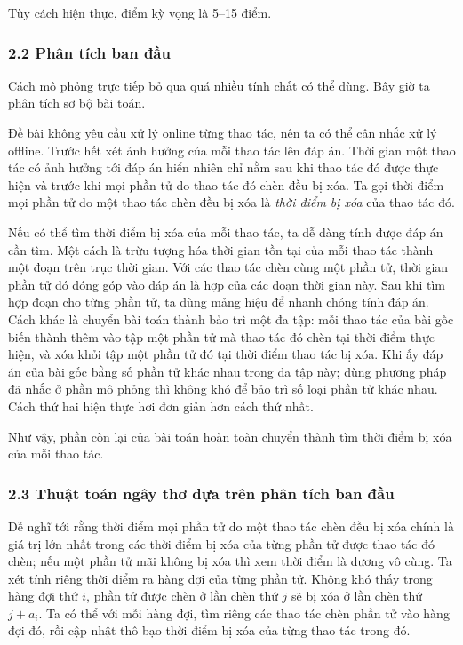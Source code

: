 \documentclass[11pt]{article}
\begin{document}
Tùy cách hiện thực, điểm kỳ vọng là 5--15 điểm.

\subsubsection*{2.2 Phân tích ban đầu}

Cách mô phỏng trực tiếp bỏ qua quá nhiều tính chất có thể dùng. Bây giờ ta phân
tích sơ bộ bài toán.

Đề bài không yêu cầu xử lý online từng thao tác, nên ta có thể cân nhắc xử lý
offline. Trước hết xét ảnh hưởng của mỗi thao tác lên đáp án. Thời gian một
thao tác có ảnh hưởng tới đáp án hiển nhiên chỉ nằm sau khi thao tác đó được
thực hiện và trước khi mọi phần tử do thao tác đó chèn đều bị xóa. Ta gọi thời
điểm mọi phần tử do một thao tác chèn đều bị xóa là \emph{thời điểm bị xóa} của
thao tác đó.

Nếu có thể tìm thời điểm bị xóa của mỗi thao tác, ta dễ dàng tính được đáp án
cần tìm. Một cách là trừu tượng hóa thời gian tồn tại của mỗi thao tác thành
một đoạn trên trục thời gian. Với các thao tác chèn cùng một phần tử, thời gian
phần tử đó đóng góp vào đáp án là hợp của các đoạn thời gian này. Sau khi tìm
hợp đoạn cho từng phần tử, ta dùng mảng hiệu để nhanh chóng tính đáp án. Cách
khác là chuyển bài toán thành bảo trì một đa tập: mỗi thao tác của bài gốc biến
thành thêm vào tập một phần tử mà thao tác đó chèn tại thời điểm thực hiện, và
xóa khỏi tập một phần tử đó tại thời điểm thao tác bị xóa. Khi ấy đáp án của bài
gốc bằng số phần tử khác nhau trong đa tập này; dùng phương pháp đã nhắc ở phần
mô phỏng thì không khó để bảo trì số loại phần tử khác nhau. Cách thứ hai hiện
thực hơi đơn giản hơn cách thứ nhất.

Như vậy, phần còn lại của bài toán hoàn toàn chuyển thành tìm thời điểm bị xóa
của mỗi thao tác.

\subsubsection*{2.3 Thuật toán ngây thơ dựa trên phân tích ban đầu}

Dễ nghĩ tới rằng thời điểm mọi phần tử do một thao tác chèn đều bị xóa chính là
giá trị lớn nhất trong các thời điểm bị xóa của từng phần tử được thao tác đó
chèn; nếu một phần tử mãi không bị xóa thì xem thời điểm là dương vô cùng. Ta
xét tính riêng thời điểm ra hàng đợi của từng phần tử. Không khó thấy trong hàng
đợi thứ \(i\), phần tử được chèn ở lần chèn thứ \(j\) sẽ bị xóa ở lần chèn thứ
\(j+a_i\). Ta có thể với mỗi hàng đợi, tìm riêng các thao tác chèn phần tử vào
hàng đợi đó, rồi cập nhật thô bạo thời điểm bị xóa của từng thao tác trong đó.
\end{document}

